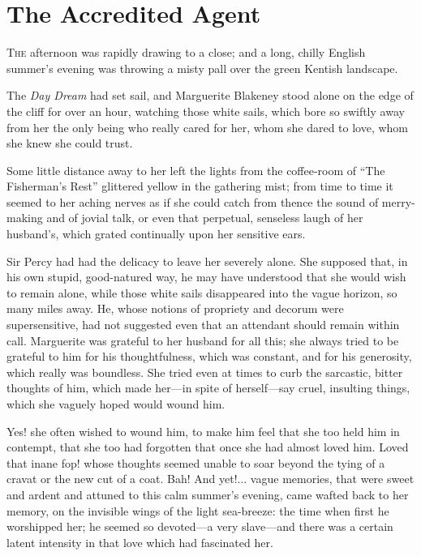 
\chapter{The Accredited Agent}
\lettrine[lines=4]{T}{he} afternoon was rapidly drawing to a close; and a long, chilly English summer's evening was throwing a misty pall over the green Kentish landscape.

The \textit{\textit{Day Dream}} had set sail, and Marguerite Blakeney stood alone on the edge of the cliff for over an hour, watching those white sails, which bore so swiftly away from her the only being who really cared for her, whom she dared to love, whom she knew she could trust.

Some little distance away to her left the lights from the coffee-room of \enquote{The Fisherman's Rest} glittered yellow in the gathering mist; from time to time it seemed to her aching nerves as if she could catch from thence the sound of merry-making and of jovial talk, or even that perpetual, senseless laugh of her husband's, which grated continually upon her sensitive ears.

Sir Percy had had the delicacy to leave her severely alone. She supposed that, in his own stupid, good-natured way, he may have understood that she would wish to remain alone, while those white sails disappeared into the vague horizon, so many miles away. He, whose notions of propriety and decorum were supersensitive, had not suggested even that an attendant should remain within call. Marguerite was grateful to her husband for all this; she always tried to be grateful to him for his thoughtfulness, which was constant, and for his generosity, which really was boundless. She tried even at times to curb the sarcastic, bitter thoughts of him, which made her---in spite of herself---say cruel, insulting things, which she vaguely hoped would wound him.

Yes! she often wished to wound him, to make him feel that she too held him in contempt, that she too had forgotten that once she had almost loved him. Loved that inane fop! whose thoughts seemed unable to soar beyond the tying of a cravat or the new cut of a coat. Bah! And yet!... vague memories, that were sweet and ardent and attuned to this calm summer's evening, came wafted back to her memory, on the invisible wings of the light sea-breeze: the time when first he worshipped her; he seemed so devoted---a very slave---and there was a certain latent intensity in that love which had fascinated her.

